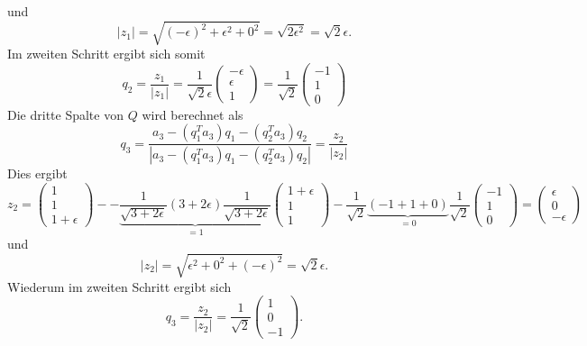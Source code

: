 und
\begin{equation*}
|z_1|=\sqrt{(-\epsilon)^2+\epsilon^2+0^2}=\sqrt{2\epsilon^2}=\sqrt{2}\epsilon.
\end{equation*}
Im zweiten Schritt ergibt sich somit
\begin{equation*}
q_2=\frac{z_1}{|z_1|}=\frac{1}{\sqrt{2}\epsilon}
\begin{pmatrix}
-\epsilon\\
\epsilon\\
1
\end{pmatrix}=
\frac{1}{\sqrt{2}}
\begin{pmatrix}
-1\\
1\\
0
\end{pmatrix}
\end{equation*}
Die dritte Spalte von $Q$ wird berechnet als
\begin{equation*}
q_3=\frac{a_3-(q_1^Ta_3)q_1-(q_2^Ta_3)q_2}{|a_3-(q_1^Ta_3)q_1-(q_2^Ta_3)q_2|}=\frac{z_2}{|z_2|}
\end{equation*}
Dies ergibt
\begin{equation*}
z_2=
\begin{pmatrix}
1\\
1\\
1+\epsilon
\end{pmatrix}--\underbrace{\frac{1}{\sqrt{3+2\epsilon}}(3+2\epsilon)\frac{1}{\sqrt{3+2\epsilon}}}_{=1}
\begin{pmatrix}
1+\epsilon\\
1\\
1
\end{pmatrix}-\frac{1}{\sqrt{2}}\underbrace{(-1+1+0)}_{=0}\frac{1}{\sqrt{2}}
\begin{pmatrix}
-1\\
1\\
0
\end{pmatrix}=
\begin{pmatrix}
\epsilon\\
0\\
-\epsilon
\end{pmatrix}
\end{equation*}
und
\begin{equation*}
|z_2|=\sqrt{\epsilon^2+0^2+(-\epsilon)^2}=\sqrt{2}\epsilon.
\end{equation*}
Wiederum im zweiten Schritt ergibt sich
\begin{equation*}
q_3=\frac{z_2}{|z_2|}=\frac{1}{\sqrt{2}}
\begin{pmatrix}
1\\
0\\
-1
\end{pmatrix}.
\end{equation*}
